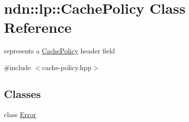 \hypertarget{classndn_1_1lp_1_1CachePolicy}{}\section{ndn\+:\+:lp\+:\+:Cache\+Policy Class Reference}
\label{classndn_1_1lp_1_1CachePolicy}


represents a \hyperlink{classndn_1_1lp_1_1CachePolicy}{Cache\+Policy} header field  




{\ttfamily \#include $<$cache-\/policy.\+hpp$>$}

\subsection*{Classes}
\begin{DoxyCompactItemize}
\item 
class \hyperlink{classndn_1_1lp_1_1CachePolicy_1_1Error}{Error}
\end{DoxyCompactItemize}
